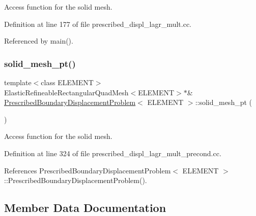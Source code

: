Access function for the solid mesh. 



Definition at line 177 of file prescribed\+\_\+displ\+\_\+lagr\+\_\+mult.\+cc.



Referenced by main().

\mbox{\label{classPrescribedBoundaryDisplacementProblem_ac0fc3028f61cec5ac4b01670d7728934}} 
\subsubsection{\texorpdfstring{solid\+\_\+mesh\+\_\+pt()}{solid\_mesh\_pt()}\hspace{0.1cm}{\footnotesize\ttfamily [3/3]}}
{\footnotesize\ttfamily template$<$class E\+L\+E\+M\+E\+NT$>$ \\
Elastic\+Refineable\+Rectangular\+Quad\+Mesh$<$E\+L\+E\+M\+E\+NT$>$$\ast$\& \hyperlink{classPrescribedBoundaryDisplacementProblem}{Prescribed\+Boundary\+Displacement\+Problem}$<$ E\+L\+E\+M\+E\+NT $>$\+::solid\+\_\+mesh\+\_\+pt (\begin{DoxyParamCaption}{ }\end{DoxyParamCaption})\hspace{0.3cm}{\ttfamily [inline]}}



Access function for the solid mesh. 



Definition at line 324 of file prescribed\+\_\+displ\+\_\+lagr\+\_\+mult\+\_\+precond.\+cc.



References Prescribed\+Boundary\+Displacement\+Problem$<$ E\+L\+E\+M\+E\+N\+T $>$\+::\+Prescribed\+Boundary\+Displacement\+Problem().



\subsection{Member Data Documentation}
\mbox{\label{classPrescribedBoundaryDisplacementProblem_aef72ea29567df89d82fe93235f1907f8}} 
